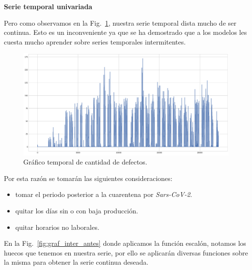 \documentclass[a4paper,12pt]{article}
\begin{document}
		\hfill
				
		\textbf{Serie temporal univariada}
				
		Pero como observamos en la Fig.~\ref{fig:graf_cantdef_antes}, nuestra serie temporal dista mucho de ser continua. Esto es un inconveniente ya que se ha demostrado que a los modelos les cuesta mucho aprender sobre series temporales intermitentes.
				
		\begin{figure}[H]
			\begin{center}
				\includegraphics[width=1\textwidth]{tesis_78.png}
				\caption{Gráfico temporal de cantidad de defectos.}
				\label{fig:graf_cantdef_antes}
			\end{center}
		\end{figure}
				
		Por esta razón se tomarán las siguientes consideraciones:
				
		\begin{itemize}[noitemsep, topsep=2pt]
			\item tomar el periodo posterior a la cuarentena por \textit{Sars-CoV-2}.
			\item quitar los días sin o con baja producción.
			\item quitar horarios no laborales.
		\end{itemize}
				
		\clearpage
				
		En la Fig.~\ref{fig:graf_inter_antes} donde aplicamos la función escalón, notamos los huecos que tenemos en nuestra serie, por ello se aplicarán diversas funciones sobre la misma para obtener la serie continua deseada.
				
\end{document}
